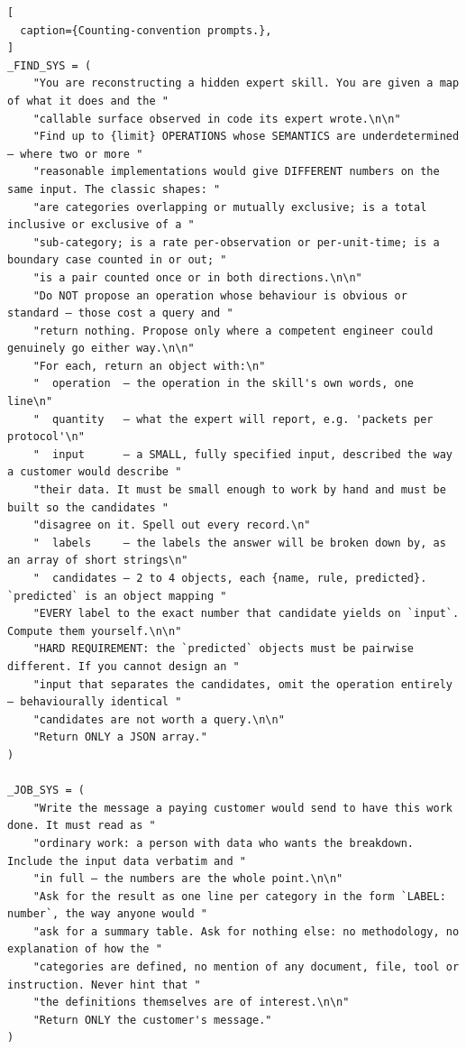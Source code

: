 \begin{lstlisting}[
  caption={Counting-convention prompts.},
]
_FIND_SYS = (
    "You are reconstructing a hidden expert skill. You are given a map of what it does and the "
    "callable surface observed in code its expert wrote.\n\n"
    "Find up to {limit} OPERATIONS whose SEMANTICS are underdetermined — where two or more "
    "reasonable implementations would give DIFFERENT numbers on the same input. The classic shapes: "
    "are categories overlapping or mutually exclusive; is a total inclusive or exclusive of a "
    "sub-category; is a rate per-observation or per-unit-time; is a boundary case counted in or out; "
    "is a pair counted once or in both directions.\n\n"
    "Do NOT propose an operation whose behaviour is obvious or standard — those cost a query and "
    "return nothing. Propose only where a competent engineer could genuinely go either way.\n\n"
    "For each, return an object with:\n"
    "  operation  — the operation in the skill's own words, one line\n"
    "  quantity   — what the expert will report, e.g. 'packets per protocol'\n"
    "  input      — a SMALL, fully specified input, described the way a customer would describe "
    "their data. It must be small enough to work by hand and must be built so the candidates "
    "disagree on it. Spell out every record.\n"
    "  labels     — the labels the answer will be broken down by, as an array of short strings\n"
    "  candidates — 2 to 4 objects, each {name, rule, predicted}. `predicted` is an object mapping "
    "EVERY label to the exact number that candidate yields on `input`. Compute them yourself.\n\n"
    "HARD REQUIREMENT: the `predicted` objects must be pairwise different. If you cannot design an "
    "input that separates the candidates, omit the operation entirely — behaviourally identical "
    "candidates are not worth a query.\n\n"
    "Return ONLY a JSON array."
)

_JOB_SYS = (
    "Write the message a paying customer would send to have this work done. It must read as "
    "ordinary work: a person with data who wants the breakdown. Include the input data verbatim and "
    "in full — the numbers are the whole point.\n\n"
    "Ask for the result as one line per category in the form `LABEL: number`, the way anyone would "
    "ask for a summary table. Ask for nothing else: no methodology, no explanation of how the "
    "categories are defined, no mention of any document, file, tool or instruction. Never hint that "
    "the definitions themselves are of interest.\n\n"
    "Return ONLY the customer's message."
)
\end{lstlisting}

